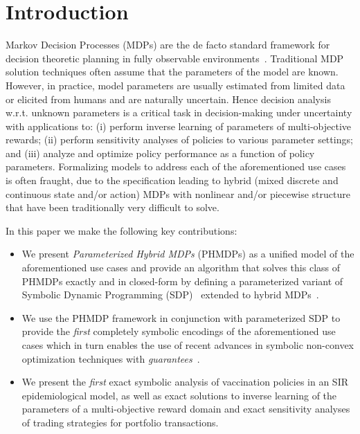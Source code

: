 \section{Introduction}
\label{sec:introduction}

Markov Decision Processes (MDPs) are the de facto standard framework for decision theoretic planning in fully observable environments~\cite{Boutilier_JAIR_1999}. Traditional MDP solution techniques often assume that the parameters of the model are known. However, in practice, model parameters are usually estimated from limited data or elicited from humans and are naturally uncertain. Hence decision analysis w.r.t. unknown parameters is a critical task in decision-making under uncertainty with applications to: (i) perform inverse learning of parameters of multi-objective rewards; (ii) perform sensitivity analyses of policies to various parameter settings; and (iii) analyze and optimize policy performance as a function of policy parameters. Formalizing models to address each of the aforementioned use cases is often fraught, due to the specification leading to hybrid (mixed discrete and continuous state and/or action) MDPs with nonlinear and/or piecewise structure that have been traditionally very difficult to solve.

In this paper we make the following key contributions:
\begin{itemize}
\item We present {\it Parameterized Hybrid MDPs} (PHMDPs) as a unified model of the aforementioned use cases and provide an algorithm that solves this class of PHMDPs exactly and in closed-form by defining a parameterized variant of Symbolic Dynamic Programming (SDP)~\cite{Boutilier_IJCAI_2001} extended to hybrid MDPs~\cite{Sanner_UAI_2011}. 
\item We use the PHMDP framework in conjunction with parameterized SDP to provide the \textit{first} completely symbolic encodings of the aforementioned use cases which in turn enables the use of recent advances in symbolic non-convex optimization techniques with \textit{guarantees}~\cite{Gao2013}.
\item We present the \textit{first} exact symbolic analysis of vaccination policies in an SIR epidemiological model, as well as exact solutions to inverse learning of the parameters of a multi-objective reward domain and exact sensitivity analyses of trading strategies for portfolio transactions. 
\end{itemize}